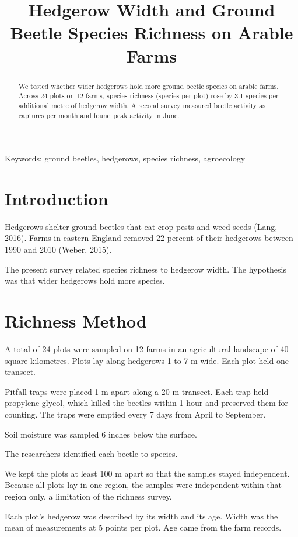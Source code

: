 \documentclass{article}
\title{Hedgerow Width and Ground Beetle Species Richness on Arable Farms}
\date{}
\begin{document}
\maketitle

\begin{abstract}
We tested whether wider hedgerows hold more ground beetle species on arable farms. Across 24 plots on 12 farms, species richness (species per plot) rose by 3.1 species per additional metre of hedgerow width. A second survey measured beetle activity as captures per month and found peak activity in June.
\end{abstract}

\noindent Keywords: ground beetles, hedgerows, species richness, agroecology

\section{Introduction}

Hedgerows shelter ground beetles that eat crop pests and weed seeds (Lang, 2016). Farms in eastern England removed 22 percent of their hedgerows between 1990 and 2010 (Weber, 2015).

The present survey related species richness to hedgerow width. The hypothesis was that wider hedgerows hold more species.

\section{Richness Method}

A total of 24 plots were sampled on 12 farms in an agricultural landscape of 40 square kilometres. Plots lay along hedgerows 1 to 7 m wide. Each plot held one transect.

Pitfall traps were placed 1 m apart along a 20 m transect. Each trap held propylene glycol, which killed the beetles within 1 hour and preserved them for counting. The traps were emptied every 7 days from April to September.

Soil moisture was sampled 6 inches below the surface.

The researchers identified each beetle to species.

We kept the plots at least 100 m apart so that the samples stayed independent. Because all plots lay in one region, the samples were independent within that region only, a limitation of the richness survey.

Each plot's hedgerow was described by its width and its age. Width was the mean of measurements at 5 points per plot. Age came from the farm records.
\end{document}
